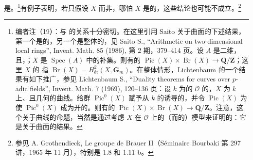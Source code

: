 是。\footnote{编者注（19）：与 的关系十分密切。在这里引用 Saito 关于曲面的下述结果，第一个是的，另一个是整体的，见 Saito S., “Arithmetic on two-dimensional local rings”, Invent. Math. 85 (1986), 第 2 期，379--414 页。设 $A$ 是二维，且，；$X$ 是 $\operatorname{Spec}(A)$ 中的补集。则有的 $\operatorname{Pic}(X)\times\operatorname{Br}(X)\to\mathbf Q/\mathbf Z$；这里 $X$ 的 指  $\operatorname{Br}(X)=H^2_{\text{ét}}(X,\mathbf G_m)$。在整体情形，Lichtenbaum 的一个结果有如下推广，参见 Lichtenbaum S., “Duality theorems for curves over $p$-adic fields”, Invent. Math. 7 (1969), 120--136 页：设 $k$ 为的 $\mathcal O$ 的，$X$ 为 $k$ 上、且几何的曲线。给群 $\operatorname{Pic}^0(X)$ 赋予从 $k$ 的诱导的，并令 $\operatorname{Pic}(X)$ 为使 $\operatorname{Pic}^0(X)$ 成为开的。则有的 $\operatorname{Pic}(X)\times\operatorname{Br}(X)\to\mathbf Q/\mathbf Z$。注意，这个关于曲线的命题，当然是通过考虑 $X$ 在 $\mathcal O$ 上的（而的）模型来证明的：它是关于曲面的结果。}有例子表明，若只假设 $X$ 而非，哪怕 $X$ 是的，这些结论也可能不成立。\footnote{参见 A. Grothendieck, Le groupe de Brauer II（Séminaire Bourbaki 第 297 讲，1965 年 11 月），特别是 1.8 和 1.11 b。}

